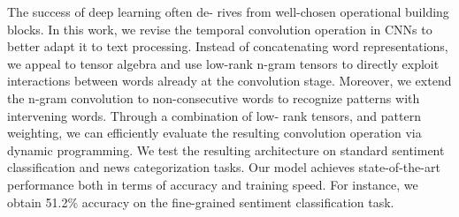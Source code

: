 The success of deep learning often de- rives from well-chosen operational building blocks. In this work, we revise the temporal convolution operation in CNNs to better adapt it to text processing. Instead of concatenating word representations, we appeal to tensor algebra and use low-rank n-gram tensors to directly exploit interactions between words already at the convolution stage. Moreover, we extend the n-gram convolution to non-consecutive words to recognize patterns with intervening words. Through a combination of low- rank tensors, and pattern weighting, we can efficiently evaluate the resulting convolution operation via dynamic programming. We test the resulting architecture on standard sentiment classification and news categorization tasks. Our model achieves state-of-the-art performance both in terms of accuracy and training speed. For instance, we obtain 51.2\% accuracy on the fine-grained sentiment classification task.
